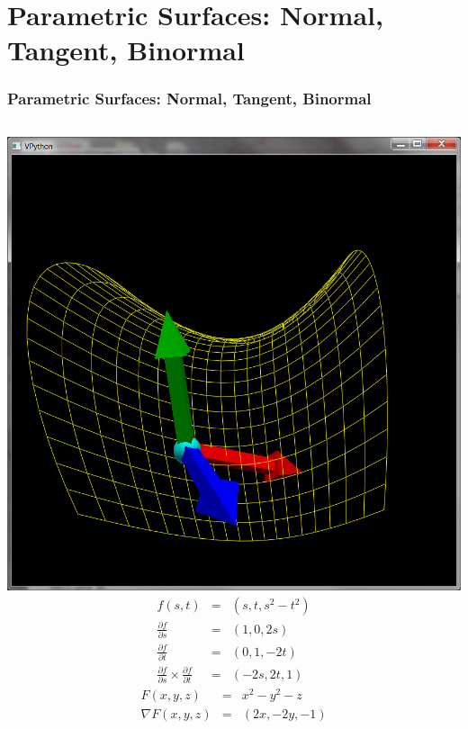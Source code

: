 \documentclass[slidestop,xcolor=pst]{beamer}
\newcommand{\sect}[1]{
\section{#1}
\begin{frame}[fragile]\frametitle{#1}
}
\begin{document}
\sect{Parametric Surfaces: Normal, Tangent, Binormal}
\begin{columns}[c]
\includegraphics[width=\textwidth]{images/vpythonpsurface.png}
\begin{eqnarray*}
f(s,t) &=& (s, t, s^2-t^2)\\
\frac{\partial f}{\partial s} &=& (1, 0, 2s)\\
\frac{\partial f}{\partial t} &=& (0, 1, -2t)\\
\frac{\partial f}{\partial s} \times
\frac{\partial f}{\partial t} &=& (-2s, 2t, 1)
\end{eqnarray*}
\begin{eqnarray*}
F(x,y,z) &=& x^2 - y^2 - z\\
\nabla F(x,y,z) &=& (2x, -2y, -1)
\end{eqnarray*}
\end{columns}
\end{frame}
\end{document}
